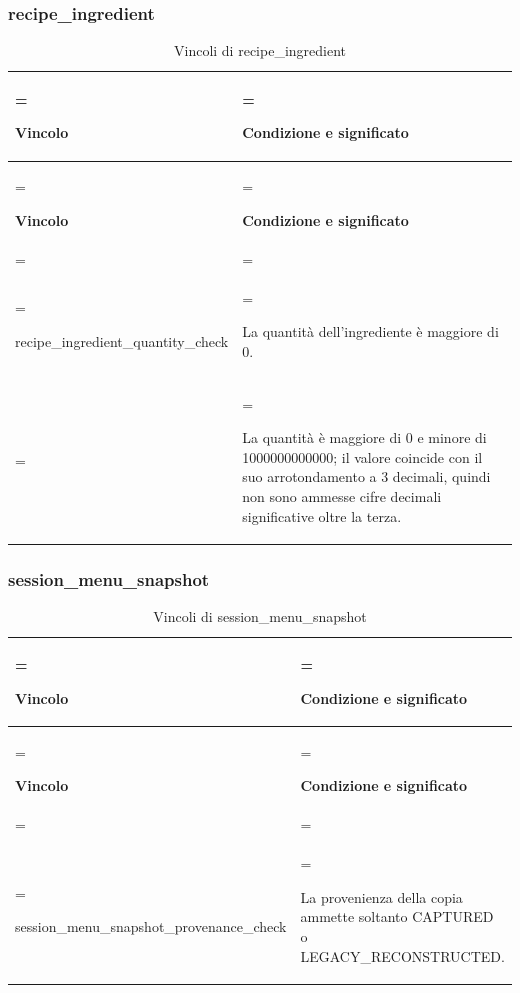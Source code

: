 \documentclass[11pt,a4paper]{article}
\begin{document}
\subsubsection{recipe\_ingredient}
{\small\renewcommand{\arraystretch}{1.25}
\begin{xltabular}{\linewidth}{>{\hsize\linewidth=\hsize\raggedright\arraybackslash}X>{\hsize\linewidth=\hsize\raggedright\arraybackslash}X}
\caption{Vincoli di recipe\_ingredient}\label{tab:dictionary-41}\\
\toprule
\textbf{Vincolo} & \textbf{Condizione e significato}\\\midrule\endfirsthead\toprule\textbf{Vincolo} & \textbf{Condizione e significato}\\\midrule\endhead
\midrule{}\\\endfoot\bottomrule\endlastfoot

{\ttfamily\small recipe\_\allowbreak{}ingredient\_\allowbreak{}quantity\_\allowbreak{}check} & La quantità dell'ingrediente è maggiore di 0.\\ & La quantità è maggiore di 0 e minore di 1000000000000; il valore coincide con il suo arrotondamento a 3 decimali, quindi non sono ammesse cifre decimali significative oltre la terza.\\*
\end{xltabular}}

\subsubsection{session\_menu\_snapshot}
{\small\renewcommand{\arraystretch}{1.25}
\begin{xltabular}{\linewidth}{>{\hsize\linewidth=\hsize\raggedright\arraybackslash}X>{\hsize\linewidth=\hsize\raggedright\arraybackslash}X}
\caption{Vincoli di session\_menu\_snapshot}\label{tab:dictionary-42}\\
\toprule
\textbf{Vincolo} & \textbf{Condizione e significato}\\\midrule\endfirsthead\toprule\textbf{Vincolo} & \textbf{Condizione e significato}\\\midrule\endhead
\midrule{}\\\endfoot\bottomrule\endlastfoot

{\ttfamily\small session\_\allowbreak{}menu\_\allowbreak{}snapshot\_\allowbreak{}provenance\_\allowbreak{}check} & La provenienza della copia ammette soltanto CAPTURED o LEGACY\_RECONSTRUCTED.\\*
\end{xltabular}}
\end{document}
